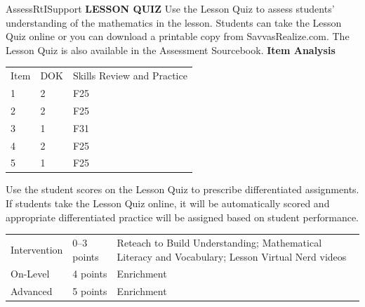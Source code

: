 \documentclass{article}
\newenvironment{te-addendum}[2]{}{}     %
\begin{document}
\begin{te-addendum}{Assess}{RtISupport}
\textbf{LESSON QUIZ}
Use the Lesson Quiz to assess students’ understanding of the mathematics in the lesson.
Students can take the Lesson Quiz online or you can download a printable copy from SavvasRealize.com. The Lesson Quiz is also available in the Assessment Sourcebook.
\textbf{Item Analysis}
\begin{tabular}{lll}
Item & DOK & Skills Review and Practice \\
1 & 2 & F25 \\
2 & 2 & F25 \\
3 & 1 & F31 \\
4 & 2 & F25 \\
5 & 1 & F25 \\
\end{tabular}
Use the student scores on the Lesson Quiz to prescribe differentiated assignments.
If students take the Lesson Quiz online, it will be automatically scored and appropriate differentiated practice will be assigned based on student performance.
\begin{tabular}{lll}
Intervention & 0--3 points & Reteach to Build Understanding; Mathematical Literacy and Vocabulary; Lesson Virtual Nerd videos \\
On-Level & 4 points & Enrichment \\
Advanced & 5 points & Enrichment \\
\end{tabular}
\end{te-addendum}
\end{document}

